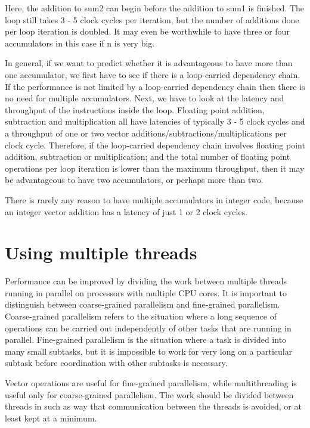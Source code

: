 \documentclass[vcl_manual.tex]{subfiles}
\begin{document}
Here, the addition to sum2 can begin before the addition to sum1 is finished. The loop still takes 3 - 5 clock cycles per iteration, but the number of additions done per loop iteration is doubled. It may even be worthwhile to have three or four accumulators in this case if n is very big.

In general, if we want to predict whether it is advantageous to have more than one accumulator, we first have to see if there is a loop-carried dependency chain. If the performance is not limited by a loop-carried dependency chain then there is no need for multiple accumulators. Next, we have to look at the latency and throughput of the instructions inside the loop. Floating point addition, subtraction and multiplication all have latencies of typically 3 - 5 clock cycles and a throughput of one or two vector additions/subtractions/multiplications per clock cycle. Therefore, if the loop-carried dependency chain involves floating point addition, subtraction or multiplication; and the total number of floating point operations per loop iteration is lower than the maximum throughput, then it may be advantageous to have two accumulators, or perhaps more than two.

There is rarely any reason to have multiple accumulators in integer code, because an integer vector addition has a latency of just 1 or 2 clock cycles.

\section{Using multiple threads}\label{UsingMultipleThreads}

Performance can be improved by dividing the work between multiple threads running in parallel on processors with multiple CPU cores. 
It is important to distinguish between coarse-grained parallelism and fine-grained parallelism. Coarse-grained parallelism refers to the situation where a long sequence of operations can be carried out independently of other tasks that are running in parallel. Fine-grained parallelism is the situation where a task is divided into many small subtasks, but it is impossible to work for very long on a particular subtask before coordination with other subtasks is necessary.

Vector operations are useful for fine-grained parallelism, while multithreading is useful only for coarse-grained parallelism. 
The work should be divided between threads in such as way that communication between the threads is avoided, or at least kept at a minimum.
\end{document}
